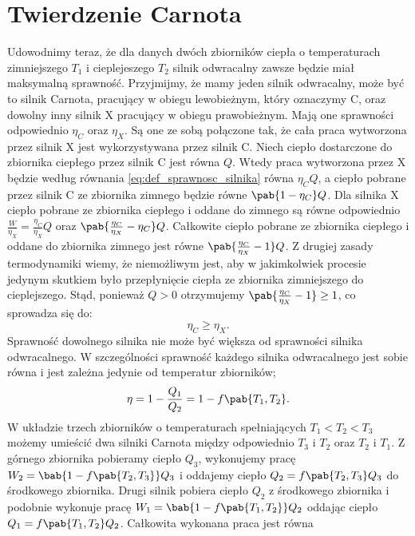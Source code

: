 \section{Twierdzenie Carnota}
Udowodnimy teraz, że dla danych dwóch zbiorników ciepła o temperaturach zimniejszego $T_1$ i cieplejeszego $T_2$ silnik odwracalny zawsze będzie miał maksymalną sprawność. Przyjmijmy, że mamy jeden silnik odwracalny, może być to silnik Carnota, pracujący w obiegu lewobieżnym, który oznaczymy C, oraz dowolny inny silnik X pracujący w obiegu prawobieżnym. Mają one sprawności odpowiednio $\eta_C$ oraz $\eta_X$. Są one ze sobą połączone tak, że cała praca wytworzona przez silnik X jest wykorzystywana przez silnik C. Niech ciepło dostarczone do zbiornika ciepłego przez silnik C jest równa $Q$. Wtedy praca wytworzona przez X będzie według równania \eqref{eq:def_sprawnosc_silnika} równa $\eta_C Q$, a ciepło pobrane przez silnik C ze zbiornika zimnego będzie równe $\pab{1 - \eta_C}Q$. Dla silnika X ciepło pobrane ze zbiornika ciepłego i oddane do zimnego są równe odpowiednio $\frac{W}{\eta_X} = \frac{\eta_C}{\eta_X}Q$ oraz $\pab{\frac{\eta_C}{\eta_X} - \eta_C}Q$. Całkowite ciepło pobrane ze zbiornika ciepłego i oddane do zbiornika zimnego jest równe $\pab{\frac{\eta_C}{\eta_X} - 1}Q$. Z drugiej zasady termodynamiki wiemy, że niemożliwym jest, aby w jakimkolwiek procesie jedynym skutkiem było przepłynięcie ciepła ze zbiornika zimniejszego do cieplejszego. Stąd, ponieważ $Q > 0$ otrzymujemy $\pab{\frac{\eta_C}{\eta_X} - 1} \geq 1$, co sprowadza się do:
\begin{equation}\label{eq:tw_carnot}
\eta_C \geq \eta_X.
\end{equation}
Sprawność dowolnego silnika nie może być większa od sprawności silnika odwracalnego. W szczególności sprawność każdego silnika odwracalnego jest sobie równa i jest zależna jedynie od temperatur zbiorników;
\begin{equation}
\eta = 1 - \frac{Q_1}{Q_2} = 1 - f\pab{T_1, T_2}.
\end{equation}
W układzie trzech zbiorników o temperaturach spełniających $T_1 < T_2 < T_3$ możemy umieścić dwa silniki Carnota między odpowiednio $T_3$ i $T_2$ oraz $T_2$ i $T_1$. Z górnego zbiornika pobieramy ciepło $Q_3$, wykonujemy pracę $W_2 = \bab{1 - f\pab{T_2, T_3}}Q_3$ i oddajemy ciepło $Q_2 = f\pab{T_2, T_3}Q_3$ do środkowego zbiornika. Drugi silnik pobiera ciepło $Q_2$ z środkowego zbiornika i podobnie wykonuje pracę $W_1 = \bab{1 - f\pab{T_1, T_2}}Q_2$ oddając ciepło $Q_1 = f\pab{T_1, T_2}Q_2$. Całkowita wykonana praca jest równa
